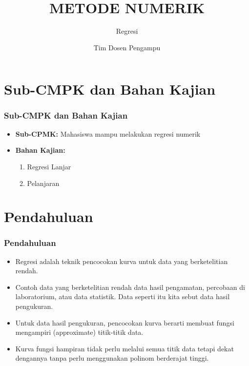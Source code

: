 \documentclass[pdflatex,compress,mathserif]{beamer}
\title{METODE NUMERIK}
\subtitle{Regresi}
\author{Tim Dosen Pengampu}
\begin{document}
\maketitle

\section{Sub-CMPK dan Bahan Kajian}

\begin{frame}
	\frametitle{Sub-CMPK dan Bahan Kajian}
	\begin{itemize}
		\item \textbf{Sub-CPMK:} Mahasiswa mampu melakukan regresi numerik
		\item \textbf{Bahan Kajian:}
		\begin{enumerate}
			\item Regresi Lanjar
			\item Pelanjaran
		\end{enumerate}
	\end{itemize}
\end{frame}

\section{Pendahuluan}

\begin{frame}
	\frametitle{Pendahuluan}
	\begin{itemize}
		\item Regresi adalah teknik pencocokan kurva untuk data yang
berketelitian rendah.
		\item Contoh data yang berketelitian rendah data hasil pengamatan, percobaan di laboratorium, atau data statistik. Data seperti itu kita
sebut data hasil pengukuran.
		\item Untuk data hasil pengukuran, pencocokan kurva berarti membuat
fungsi mengampiri (approximate) titik-titik data.
		\item Kurva fungsi hampiran tidak perlu melalui semua titik data tetapi
dekat dengannya tanpa perlu menggunakan polinom berderajat
tinggi.
	\end{itemize}
\end{frame}
\end{document}
